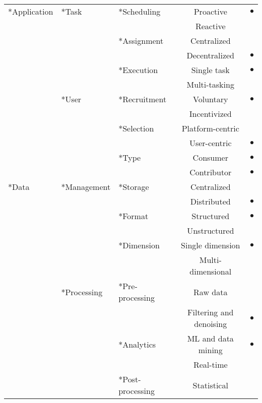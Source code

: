 \begin{table}[htbp]
\renewcommand{\arraystretch}{0.85}
\scriptsize
\centering
\begin{tabularx}{\textwidth}{
    >{\centering\arraybackslash}X
    >{\centering\arraybackslash}X
    >{\centering\arraybackslash}X
    c
    >{\centering\arraybackslash}X}
\toprule
\multirow{12}*{Application}
	& \multirow{6}*{Task}
		& \multirow{2}*{Scheduling}
			& Proactive & $\bullet$ \\
			&&& Reactive & \\
		\cmidrule{3-5}
		&& \multirow{2}*{Assignment}
			& Centralized & \\
			&&& Decentralized & $\bullet$ \\
		\cmidrule{3-5}
		&& \multirow{2}*{Execution}
			& Single task & $\bullet$ \\
			&&& Multi-tasking & \\
	\cmidrule{2-5}
	& \multirow{6}*{User}
		& \multirow{2}*{Recruitment}
			& Voluntary & $\bullet$ \\
			&&& Incentivized & \\
		\cmidrule{3-5}
		&& \multirow{2}*{Selection}
			& Platform-centric & \\
			&&& User-centric & $\bullet$ \\
		\cmidrule{3-5}
		&& \multirow{2}*{Type}
			& Consumer & $\bullet$ \\
			&&& Contributor & $\bullet$ \\
		\cmidrule{2-5}
\cmidrule{1-5}
\multirow{12}*{Data}
	& \multirow{6}*{Management}
		& \multirow{2}*{Storage}
			& Centralized & \\
			&&& Distributed & $\bullet$ \\
		\cmidrule{3-5}
		&& \multirow{2}*{Format}
			& Structured & $\bullet$ \\
			&&& Unstructured & \\
		\cmidrule{3-5}
		&& \multirow{2}*{Dimension}
			& Single dimension & $\bullet$ \\
			&&& Multi-dimensional & \\
	\cmidrule{2-5}
	& \multirow{6}*{Processing}
		& \multirow{2}*{Pre-processing}
			& Raw data & \\
			&&& Filtering and denoising & $\bullet$ \\
		\cmidrule{3-5}
		&& \multirow{2}*{Analytics}
			& ML and data mining & $\bullet$ \\
			&&& Real-time & \\
		\cmidrule{3-5}
		&& \multirow{2}*{Post-processing}
			& Statistical & \\

\end{tabularx}
\end{table}
